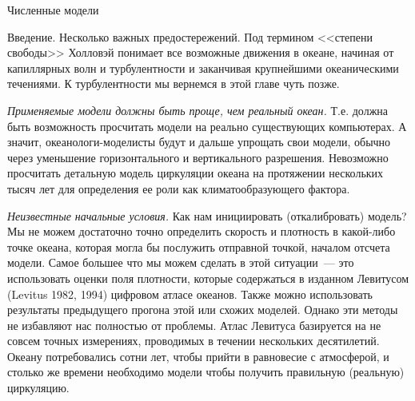 \begin{chapter}{Численные модели}
\begin{section}{Введение. Несколько важных предостережений.}
Под термином <<степени свободы>> Холловэй понимает все возможные
движения в океане, начиная от капиллярных волн и турбулентности и
заканчивая крупнейшими океаническими течениями. К турбулентности мы
вернемся в этой главе чуть позже.
%

\emph{Применяемые модели должны быть проще, чем реальный океан.} 
Т.е. должна быть возможность просчитать модели на реально существующих
компьютерах. А значит, океанологи-моделисты будут и дальше упрощать
свои модели, обычно через уменьшение горизонтального и вертикального
разрешения. Невозможно просчитать детальную модель циркуляции океана
на протяжении нескольких тысяч лет для определения ее роли как
климатообразующего фактора.
%

\emph{Неизвестные начальные условия.} 
Как нам инициировать (откалибровать) модель? Мы не можем достаточно
точно определить скорость и плотность в какой-либо точке океана,
которая могла бы послужить отправной точкой, началом отсчета
модели. Самое большее что мы можем сделать в этой ситуации~--- это
использовать оценки поля плотности, которые содержаться в изданном
Левитусом (Levitus 1982, 1994) цифровом атласе океанов. Также можно
использовать результаты предыдущего прогона этой или схожих
моделей. Однако эти методы не избавляют нас полностью от
проблемы. Атлас Левитуса базируется на не совсем точных измерениях,
проводимых в течении нескольких десятилетий. Океану потребовались
сотни лет, чтобы прийти в равновесие с атмосферой, и столько же
времени необходимо модели чтобы получить правильную (реальную)
циркуляцию.


\end{section}
\end{chapter}
